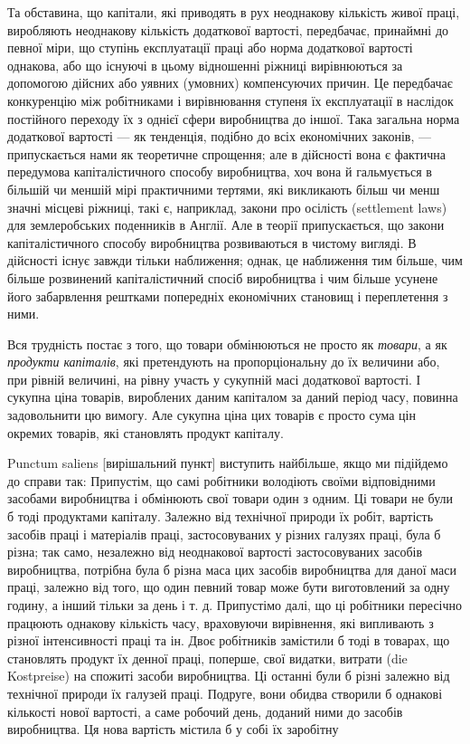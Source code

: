 Та обставина, що капітали, які приводять в рух неоднакову
кількість живої праці, виробляють неоднакову кількість додаткової
вартості, передбачає, принаймні до певної міри, що ступінь
експлуатації праці або норма додаткової вартості однакова, або
що існуючі в цьому відношенні ріжниці вирівнюються за допомогою
дійсних або уявних (умовних) компенсуючих причин.
Це передбачає конкуренцію між робітниками і вирівнювання
ступеня їх експлуатації в наслідок постійного переходу їх
з однієї сфери виробництва до іншої. Така загальна норма додаткової
вартості — як тенденція, подібно до всіх економічних
законів, — припускається нами як теоретичне спрощення; але
в дійсності вона є фактична передумова капіталістичного способу
виробництва, хоч вона й гальмується в більшій чи меншій
мірі практичними тертями, які викликають більш чи менш
значні місцеві ріжниці, такі є, наприклад, закони про осілість
(settlement laws) для землеробських поденників в Англії. Але
в теорії припускається, що закони капіталістичного способу
виробництва розвиваються в чистому вигляді. В дійсності існує
завжди тільки наближення; однак, це наближення тим більше,
чим більше розвинений капіталістичний спосіб виробництва і чим
більше усунене його забарвлення рештками попередніх економічних
становищ і переплетення з ними.

Вся трудність постає з того, що товари обмінюються не
просто як \emph{товари}, а як \emph{продукти капіталів}, які претендують
на пропорціональну до їх величини або, при рівній величині, на
рівну участь у сукупній масі додаткової вартості. І сукупна
ціна товарів, вироблених даним капіталом за даний період часу,
повинна задовольнити цю вимогу. Але сукупна ціна цих товарів
є просто сума цін окремих товарів, які становлять продукт
капіталу.

Punctum saliens [вирішальний пункт] виступить найбільше, якщо
ми підійдемо до справи так: Припустім, що самі робітники
володіють своїми відповідними засобами виробництва і обмінюють
свої товари один з одним. Ці товари не були б тоді
продуктами капіталу. Залежно від технічної природи їх робіт,
вартість засобів праці і матеріалів праці, застосовуваних у різних
галузях праці, була б різна; так само, незалежно від неоднакової
вартості застосовуваних засобів виробництва, потрібна була б
різна маса цих засобів виробництва для даної маси праці, залежно
від того, що один певний товар може бути виготовлений
за одну годину, а інший тільки за день і т. д. Припустімо
далі, що ці робітники пересічно працюють однакову кількість
часу, враховуючи вирівнення, які випливають з різної інтенсивності
праці та ін. Двоє робітників замістили б тоді в товарах,
що становлять продукт їх денної праці, поперше, свої
видатки, витрати (die Kostpreise) на спожиті засоби виробництва.
Ці останні були б різні залежно від технічної природи їх галузей
праці. Подруге, вони обидва створили б однакові кількості
нової вартості, а саме робочий день, доданий ними до засобів
виробництва. Ця нова вартість містила б у собі їх заробітну
\parbreak{}  %
